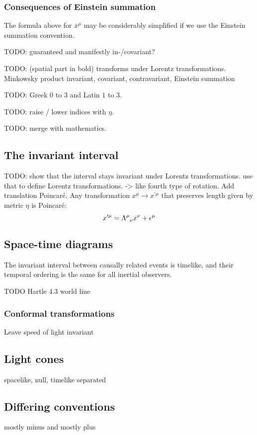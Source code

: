 \subsubsection{Consequences of Einstein summation} The formula above for $\bar{x}^\mu$ may be considerably simplified if we use the Einstein summation convention.

TODO: guaranteed and manifestly in-/covariant?

TODO:  (spatial part in bold) transforms under Lorentz transformations. Minkowsky product invariant, covariant, contravariant, Einstein summation

TODO: Greek $0$ to $3$ and Latin $1$ to $3$.

TODO: raise / lower indices with $\eta$.

TODO: merge with mathematics.
 
\subsection{The invariant interval} TODO: show that the interval stays invariant under Lorentz transformations. use that to define Lorentz transformations. -> like fourth type of rotation. Add translation Poincaré. Any transformation $x^\mu \to x^{\prime\mu}$ that preserves length given by metric $\eta$ is Poincaré:
\[ x^{\prime\mu} = \tensor{\Lambda}{^\mu_\nu}x^\nu + \epsilon^\mu \] 
\subsection{Space-time diagrams}
The invariant interval between causally related events is timelike, and their temporal ordering is the same for all inertial observers.

TODO Hartle 4.3 world line

\subsubsection{Conformal transformations}
Leave speed of light invariant

\subsection{Light cones}
spacelike, null, timelike separated

\subsection{Differing conventions}
mostly minus and mostly plus

